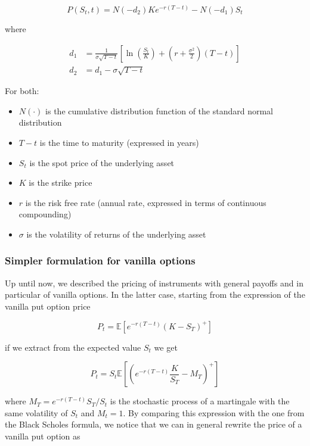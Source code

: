 \documentclass[11pt]{article}
\providecommand{\tightlist}{%
      \setlength{\itemsep}{0pt}\setlength{\parskip}{0pt}}
\begin{document}
\begin{equation} \label{eq:2}
P(S_{t},t) = N(-d_{2})Ke^{-r(T-t)}-N(-d_{1})S_{t}
\end{equation}

where

\begin{align}
d_{1} &={\frac {1}{\sigma {\sqrt {T-t}}}}\left[\ln \left({\frac {S_{t}}{K}}\right)+\left(r+{\frac {\sigma ^{2}}{2}}\right)(T-t)\right]\\
d_{2} &= d_{1}-\sigma {\sqrt {T-t}}
\end{align}

For both:

\begin{itemize}
\tightlist
\item
  \(N(\cdot )\) is the cumulative distribution function of the standard
  normal distribution
\item
  \(T-t\) is the time to maturity (expressed in years)
\item
  \(S_{t}\) is the spot price of the underlying asset
\item
  \(K\) is the strike price
\item
  \(r\) is the risk free rate (annual rate, expressed in terms of
  continuous compounding)
\item
  \(\sigma\) is the volatility of returns of the underlying asset
\end{itemize}

    \hypertarget{simpler-formulation-for-vanilla-options}{%
\subsubsection{Simpler formulation for vanilla
options}\label{simpler-formulation-for-vanilla-options}}

    Up until now, we described the pricing of instruments with general
payoffs and in particular of vanilla options. In the latter case,
starting from the expression of the vanilla put option price

\[
P_t = \mathbb{E} \left[e^{-r(T-t)} (K-S_T)^+ \right] 
\]

if we extract from the expected value \(S_t\) we get

\[
P_t = S_t \mathbb{E} \left[ \left( e^{-r(T-t)} \frac{K}{S_T} - M_T \right)^+ \right] 
\]

where \(M_T = e^{-r(T-t)}S_T/S_t\) is the stochastic process of a
martingale with the same volatility of \(S_t\) and \(M_t = 1\). By
comparing this expression with the one from the Black Scholes formula,
we notice that we can in general rewrite the price of a vanilla put
option as
\end{document}
